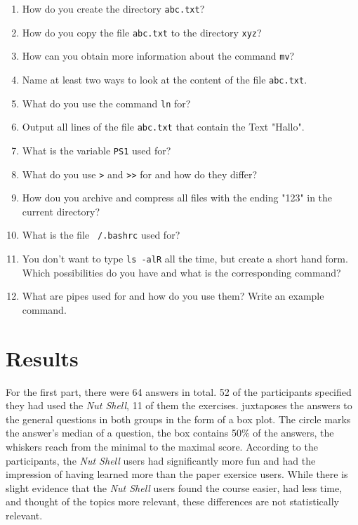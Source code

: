 \documentclass[paper=a4,twoside,abstract=on,cleardoublepage=empty,numbers=noenddot,toc=bib,12pt]{scrreprt}
\begin{document}
\begin{enumerate}
    \item How do you create the directory \texttt{abc.txt}?
    \item How do you copy the file \texttt{abc.txt} to the directory \texttt{xyz}?
    \item How can you obtain more information about the command \texttt{mv}?
    \item Name at least two ways to look at the content of the file \texttt{abc.txt}.
    \item What do you use the command \texttt{ln} for?
    \item Output all lines of the file \texttt{abc.txt} that contain the Text "Hallo".
    \item What is the variable \texttt{PS1} used for?
    \item What do you use \texttt{>} and \texttt{>>} for and how do they differ?
    \item How dou you archive and compress all files with the ending "123" in the current directory?
    \item What is the file \texttt{~/.bashrc} used for?
    \item You don't want to type \texttt{ls -alR} all the time, but create a short hand form. Which possibilities do you have and what is the corresponding command?
    \item What are pipes used for and how do you use them? Write an example command.
\end{enumerate}

\section{Results}

For the first part, there were 64 answers in total. 52 of the participants specified they had used the \emph{Nut Shell}, 11 of them the exercises.  juxtaposes the answers to the general questions in both groups in the form of a box plot. The circle marks the answer's median of a question, the box contains 50\% of the answers, the whiskers reach from the minimal to the maximal score. According to the participants, the \emph{Nut Shell} users had significantly more fun and had the impression of having learned more than the paper exersice users. While there is slight evidence that the \emph{Nut Shell} users found the course easier, had less time, and thought of the topics more relevant, these differences are not statistically relevant.
\end{document}
